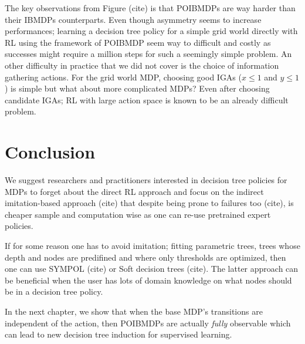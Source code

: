 The key observations from Figure (cite) is that POIBMDPs are way harder than their IBMDPs counterparts.
Even though asymmetry seems to increase performances; learning a decision tree policy for a simple grid world directly with RL using the framework of POIBMDP seem way to difficult and costly as successes might require a million steps for such a seemingly simple problem.
An other difficulty in practice that we did not cover is the choice of information gathering actions.
For the grid world MDP, choosing good IGAs ($x\leq1$ and $y\leq1$) is simple but what about more complicated MDPs? 
Even after choosing candidate IGAs; RL with large action space is known to be an already difficult problem.


\section{Conclusion}
We suggest researchers and practitioners interested in decision tree policies for MDPs to forget about the direct RL approach and focus on the indirect imitation-based approach (cite) that despite being prone to failures too (cite), is cheaper sample and computation wise as one can re-use pretrained expert policies.

If for some reason one has to avoid imitation; fitting parametric trees, trees whose depth and nodes are predifined and where only thresholds are optimized, then one can use SYMPOL (cite) or Soft decision trees (cite).
The latter approach can be beneficial when the user has lots of domain knowledge on what nodes should be in a decision tree policy.

In the next chapter, we show that when the base MDP's transitions are independent of the action, then POIBMDPs are actually \textit{fully} observable which can lead to new decision tree induction for supervised learning.